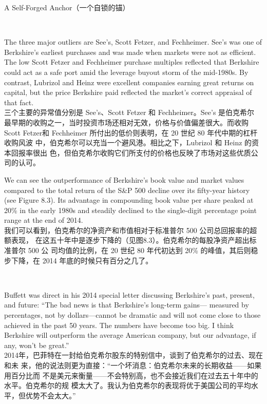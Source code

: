 \begin{section}{A Self-Forged Anchor（一个自锁的锚）}
\begin{verseparallel}
\end{verseparallel}

{\color{red}{此处缺图 8.2}} \\

\begin{verseparallel}
  {
    The three major outliers are See's, Scott Fetzer, and Fechheimer. See's
    was one of Berkshire's earliest purchases and was made when markets were
    not as efficient. The low Scott Fetzer and Fechheimer purchase multiples
    reflected that Berkshire could act as a safe port amid the leverage buyout
    storm of the mid-1980s. By contrast, Lubrizol and Heinz were excellent
    companies earning great returns on capital, but the price Berkshire paid
    reflected the market's correct appraisal of that fact. \\
  }
  {
    三个主要的异常值分别是 See’s、Scott Fetzer 和 Fechheimer。See’s 是伯克希尔
    最早期的收购之一，当时投资市场还相对无效，价格与价值偏差很大。而收购 Scott
    Fetzer和 Fechheimer 所付出的低价则表明，在 20 世纪 80 年代中期的杠杆收购风波
    中，伯克希尔可以充当一个避风港。相比之下，Lubrizol 和 Heinz 的资本回报率很出
    色，但伯克希尔收购它们所支付的价格也反映了市场对这些优质公司的认可。
  }
\end{verseparallel}

\begin{verseparallel}
  {
    We can see the outperformance of Berkshire's book value and market values
    compared to the total return of the S\&P 500 decline over its fifty-year
    history (see Figure 8.3). Its advantage in compounding book value per share
    peaked at 20\% in the early 1980s and steadily declined to the single-digit
    percentage point range at the end of 2014. \\
  }
  {
    我们可以看到，伯克希尔的净资产和市值相对于标准普尔 500 公司总回报率的超额表现，
    在这五十年中是逐步下降的（见图8.3）。伯克希尔的每股净资产超出标准普尔 500 公
    司均值的比例，在 20 世纪 80 年代初达到 20\% 的峰值，其后则稳步下降，在 2014
    年底的时候只有百分之几了。
  }
\end{verseparallel}

{\color{red}{此处缺图 8.3 和图 8.4}} \\

\begin{verseparallel}
  {
    Buffett was direct in his 2014 special letter discussing Berkshire's past,
    present, and future: ``The bad news is that Berkshire's long-term gains—
    measured by percentages, not by dollars—cannot be dramatic and will not come
    close to those achieved in the past 50 years. The numbers have become too
    big. I think Berkshire will outperform the average American company, but our
    advantage, if any, won't be great.'' \\
  }
  {
    2014年，巴菲特在一封给伯克希尔股东的特别信中，谈到了伯克希尔的过去、现在和未
    来，他的说法则更为直接：“一个坏消息：伯克希尔未来的长期收益——如果用百分比而
    不是美元来衡量——不会特别高，也不会接近我们在过去五十年中的水平。伯克希尔的规
    模太大了。我认为伯克希尔的表现将优于美国公司的平均水平，但优势不会太大。”
  }
\end{verseparallel}


\end{section}
